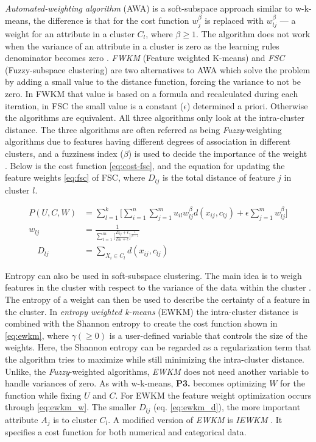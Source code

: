 \documentclass[../report.tex]{subfiles}
\begin{document}
\textit{Automated-weighting algorithm} (AWA) \cite{Chan2004} is a soft-subspace approach similar to w-k-means, the difference is that for the cost function $w_j^\beta$ is replaced with $w_{ lj }^\beta$ --- a weight for an attribute in a cluster $C_l$, where $\beta \geq 1$. The algorithm does not work when the variance of an attribute in a cluster is zero as the learning rules denominator becomes zero \cite{Jing2005}. \textit{FWKM} (Feature weighted K-means) \cite{Jing2005} and \textit{FSC} (Fuzzy-subspace clustering) \cite{Gan2006} are two alternatives to AWA which solve the problem by adding a small value to the distance function, forcing the variance to not be zero. In FWKM that value is based on a formula and recalculated during each iteration, in FSC the small value is a constant ($\epsilon$) determined a priori. Otherwise the algorithms are equivalent. All three algorithms only look at the intra-cluster distance. The three algorithms are often referred as being \textit{Fuzzy}-weighting algorithms due to features having different degrees of association in different clusters, and a fuzziness index ($\beta$) is used to decide the importance of the weight \cite{Gan2006}. Below is the cost function \cref{eq:cost-fsc}, and the equation for updating the feature weights \cref{eq:fsc} of FSC, where $D_{lj}$ is the total distance of feature $j$ in cluster $l$.

\begin{align}
\label{eq:cost-fsc}
  P(U,C,W) &= \sum^k_{l=1} \Bigg[ \sum^n_{i=1} \sum^m_{j=1} u_{il} w_{ lj }^{\beta} d(x_{ij},c_{lj}) + \epsilon \sum_{j=1}^{m}{ w_{lj}^{\beta} } \Bigg] \\
\label{eq:fsc}
w_{lj} &= \frac{1}{{\sum_{t=1}^{m}\Big[\frac{D_{lj} + \epsilon}{D_{lt} + \epsilon}}\Big]^{\frac{1}{\beta - 1}}} \\
\quad D_{ lj } &= \sum_{X_i \in C_l}{d(x_{ij},c_{ lj })}
\end{align}


Entropy can also be used in soft-subspace clustering. The main idea is to weigh features in the cluster with respect to the variance of the data within the cluster \cite{Domeniconi2007}. The entropy of a weight can then be used to describe the certainty of a feature in the cluster. In \textit{entropy weighted k-means} (EWKM) \cite{Jing2007} the intra-cluster distance is combined with the Shannon entropy to create the cost function shown in \cref{eq:ewkm}, where $\gamma (\geq 0)$ is a user-defined variable that controls the size of the weights. Here, the Shannon entropy can be regarded as a regularization term that the algorithm tries to maximize while still minimizing the intra-cluster distance. Unlike, the \textit{Fuzzy}-weighted algorithms, \textit{EWKM} does not need another variable to handle variances of zero. As with w-k-means, \textbf{P3.} becomes optimizing $W$ for the function while fixing $U$ and $C$. For EWKM the feature weight optimization occurs through \cref{eq:ewkm_w}. The smaller $D_{ lj }$ (eq. \ref{eq:ewkm_d}), the more important attribute $A_j$ is to cluster $C_l$. A modified version of \textit{EWKM} is \textit{IEWKM} \cite{Li2008}. It specifies a cost function for both numerical and categorical data.
\end{document}
